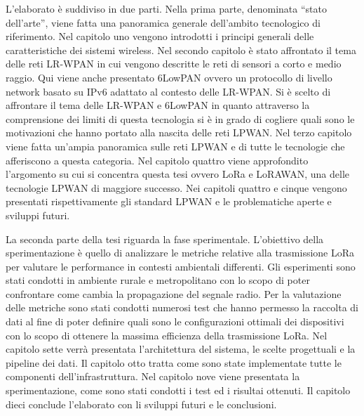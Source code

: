 \documentclass[12pt,a4paper,openright,twoside]{report}
\begin{document}
L'elaborato \`e suddiviso in due parti. Nella prima parte, denominata ``stato dell'arte'', viene fatta una panoramica generale dell'ambito tecnologico di riferimento.
Nel capitolo uno vengono introdotti i principi generali delle caratteristiche dei sistemi wireless. Nel secondo capitolo \`e stato affrontato il tema delle reti LR-WPAN in cui vengono descritte le reti di sensori a corto e medio raggio. Qui viene anche presentato 6LowPAN ovvero un protocollo di livello network basato su IPv6 adattato al contesto delle LR-WPAN.
Si \`e scelto di affrontare il tema delle LR-WPAN e 6LowPAN in quanto attraverso la comprensione dei limiti di questa tecnologia si \`e in grado di cogliere quali sono le motivazioni che hanno portato alla nascita delle reti LPWAN.
Nel terzo capitolo viene fatta un'ampia panoramica sulle reti LPWAN e di tutte le tecnologie che afferiscono a questa categoria. 
Nel capitolo quattro viene approfondito l'argomento su cui si concentra questa tesi ovvero LoRa e LoRAWAN, una delle tecnologie LPWAN di maggiore successo. 
Nei capitoli quattro e cinque vengono presentati rispettivamente gli standard LPWAN e le problematiche aperte e sviluppi futuri.  

La seconda parte della tesi riguarda la fase sperimentale. 
L'obiettivo della sperimentazione \`e quello di analizzare le metriche relative alla trasmissione LoRa per valutare le performance in contesti ambientali differenti. 
Gli esperimenti sono stati condotti in ambiente rurale e metropolitano con lo scopo di poter confrontare come cambia la propagazione del segnale radio. 
Per la valutazione delle metriche sono stati condotti numerosi test che hanno permesso la raccolta di dati al fine di poter definire quali sono le configurazioni ottimali dei dispositivi con lo scopo di ottenere la massima efficienza della trasmissione LoRa. 
Nel capitolo sette verr\`a presentata l'architettura del sistema, le scelte progettuali e la pipeline dei dati. Il capitolo otto tratta come sono state implementate tutte le componenti dell'infrastruttura. Nel capitolo nove viene presentata la sperimentazione, come sono stati condotti i test ed i risultai ottenuti. Il capitolo dieci conclude l'elaborato con li sviluppi futuri e le conclusioni.





\clearpage{\pagestyle{empty}\cleardoublepage}
\tableofcontents                        %
\rhead[\fancyplain{}{\bfseries\leftmark}]{\fancyplain{}{\bfseries\thepage}}
\clearpage{\pagestyle{empty}\cleardoublepage}
\listoffigures                          %
\clearpage{\pagestyle{empty}\cleardoublepage}
\listoftables                           %
\clearpage{\pagestyle{empty}\cleardoublepage}
\end{document}
